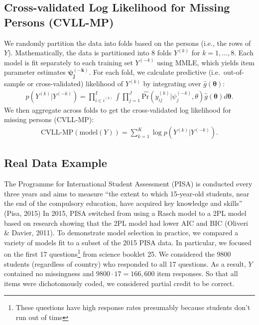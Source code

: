 \documentclass[
  english,
  man,floatsintext]{apa7}
\begin{document}
\hypertarget{cross-validated-log-likelihood-for-missing-persons-cvll-mp}{%
\subsection{Cross-validated Log Likelihood for Missing Persons (CVLL-MP)}\label{cross-validated-log-likelihood-for-missing-persons-cvll-mp}}

We randomly partition the data into folds based on the persons (i.e., the rows of \(Y\)). Mathematically, the data is partitioned into 8 folds \(Y^{(k)}\) for \(k = 1, \dots, 8\). Each model is fit separately to each training set \(Y^{(-k)}\) using MMLE, which yields item parameter estimates \(\bm{\psi_j^{(-k)}}\). For each fold, we calculate predictive (i.e.~out-of-sample or cross-validated) likelihood of \(Y^{(k)}\) by integrating over \(\hat g(\bm{\theta})\):
\begin{align}
p(Y^{(k)} | Y^{(-k)}) = \prod_{i \in i^{(k)}}^{I} \int \prod_{j=1}^{J} \hat{\text{Pr}}(y_{ij}^{(k)} | \psi_j^{(-k)}, \theta) \hat g(\bm{\theta})d\bm{\theta}.
\end{align}
We then aggregate across folds to get the cross-validated log likelihood for missing persons (CVLL-MP):
\begin{align}
\text{CVLL-MP}(\text{model}(Y)) = \sum_{k = 1}^{K} \log p(Y^{(k)} | Y^{(-k)}).
\end{align}

\hypertarget{real-data-example}{%
\subsection{Real Data Example}\label{real-data-example}}

The Programme for International Student Assessment (PISA) is conducted every three years and aims to measure ``the extent to which 15-year-old students, near the end of the compulsory education, have acquired key knowledge and skills'' (Pisa, 2015) In 2015, PISA switched from using a Rasch model to a 2PL model based on research showing that the 2PL model had lower AIC and BIC (Oliveri \& Davier, 2011). To demonstrate model selection in practice, we compared a variety of models fit to a subset of the 2015 PISA data. In particular, we focused on the first 17 questions\footnote{These questions have high response rates presumably because students don't run out of time} from science booklet 25. We considered the 9800 students (regardless of country) who responded to all 17 questions. As a result, \(Y\) contained no missingness and \(9800 \cdot 17 = 166,600\) item responses. So that all items were dichotomously coded, we considered partial credit to be correct.
\end{document}
